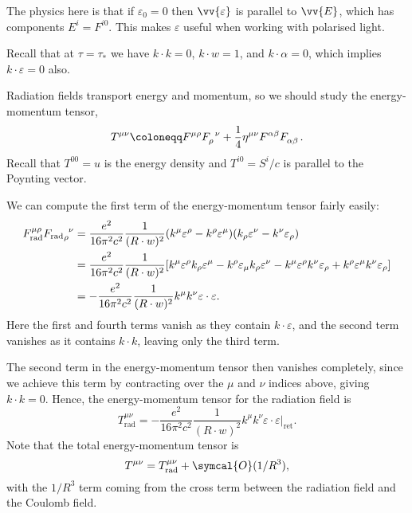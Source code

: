 \documentclass[fleqn]{NotesClass}
\newcommand*{\order}{\symcal{O}}
\newcommand*{\ret}{{\text{ret}}}
\newcommand*{\rad}{\text{rad}}
\begin{document}
    The physics here is that if \(\varepsilon_0 = 0\) then \(\vv{\varepsilon}\) is parallel to \(\vv{E}\), which has components \(E^i = F^{i0}\).
    This makes \(\varepsilon\) useful when working with polarised light.
    
    Recall that at \(\tau = \tau_*\) we have \(k \cdot k = 0\), \(k \cdot w = 1\), and \(k \cdot \alpha = 0\), which implies \(k \cdot \varepsilon = 0\) also.
    
    Radiation fields transport energy and momentum, so we should study the energy-momentum tensor,
    \begin{equation}
        \tensor{T}{^{\mu\nu}} \coloneqq \tensor{F}{^{\mu\rho}}\tensor{F}{_\rho^\nu} + \frac{1}{4}\eta^{\mu\nu} \tensor{F}{^{\alpha\beta}} \tensor{F}{_{\alpha\beta}}.
    \end{equation}
    Recall that \(T^{00} = u\) is the energy density and \(T^{i0} = S^i/c\) is parallel to the Poynting vector.
    
    We can compute the first term of the energy-momentum tensor fairly easily:
    \begin{align}
        \tensor*{F}{_{\rad}^{\mu\rho}}\tensor{{F_{\rad}}}{_\rho^\nu} &= \frac{e^2}{16\pi^2 c^2} \frac{1}{(R \cdot w)^2} (k^\mu \varepsilon^\rho - k^\rho \varepsilon^\mu)(k_\rho \varepsilon^\nu - k^\nu \varepsilon_\rho)\\
        &= \frac{e^2}{16\pi^2 c^2} \frac{1}{(R \cdot w)^2}[k^\mu \varepsilon^\rho k_\rho \varepsilon^\mu - k^\rho \varepsilon_\mu k_\rho \varepsilon^\nu - k^\mu \varepsilon^\rho k^\nu \varepsilon_\rho + k^\rho \varepsilon^\mu k^\nu \varepsilon_\rho] \notag\\
        &= -\frac{e^2}{16\pi^2 c^2} \frac{1}{(R \cdot w)^2} k^\mu k^\nu \varepsilon \cdot \varepsilon.
    \end{align}
    Here the first and fourth terms vanish as they contain \(k \cdot \varepsilon\), and the second term vanishes as it contains \(k \cdot k\), leaving only the third term.
    
    The second term in the energy-momentum tensor then vanishes completely, since we achieve this term by contracting over the \(\mu\) and \(\nu\) indices above, giving \(k \cdot k = 0\).
    Hence, the energy-momentum tensor for the radiation field is
    \begin{equation}
        T_{\rad}^{\mu\nu} = -\frac{e^2}{16\pi^2 c^2} \frac{1}{(R \cdot w)^2} k^\mu k^\nu \varepsilon \cdot \varepsilon \bigg|_{\ret}.
    \end{equation}
    Note that the total energy-momentum tensor is
    \begin{equation}
        T^{\mu\nu} = T_{\rad}^{\mu\nu} + \order(1/R^3),
    \end{equation}
    with the \(1/R^3\) term coming from the cross term between the radiation field and the Coulomb field.
    
\end{document}
